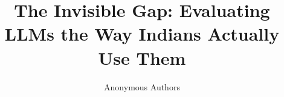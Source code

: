\documentclass{article}
\title{The Invisible Gap: Evaluating LLMs the Way Indians Actually Use Them}
\author{Anonymous Authors}
\begin{document}
\ifcolmsubmission
\linenumbers
\fi

\maketitle













\appendix

\end{document}
